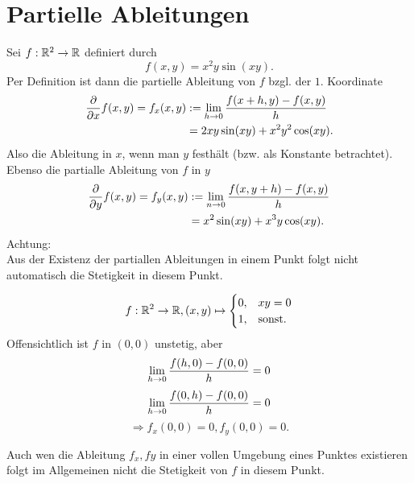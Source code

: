 \documentclass[../ana2u.tex]{subfiles}
\begin{document}
\setcounter{section}{8}
\section{Partielle Ableitungen}
Sei \( f:\mathbb{R}^2\rightarrow \mathbb{R} \) definiert 
durch 
\[ f(x,y) = x^2 y \sin(xy). \]
Per Definition ist dann die partielle 
Ableitung von \(f\) bzgl. der \(1.\) Koordinate
\begin{align*}
    \frac{\partial}{\partial x} f(x,y) = f_x(x,y) 
    &:= \lim\limits_{h\rightarrow{}0} \frac{f(x+h,y) - f(x,y)}{h} \\
    &= 2xy \sin(xy) + x^2y^2 \cos(xy).
\end{align*}
Also die Ableitung in \(x\), wenn man \(y\)
festhält (bzw. als Konstante betrachtet). \\
Ebenso die partialle Ableitung von \(f\) in \(y\)
\begin{align*}
    \frac{\partial}{\partial y} f(x,y) = f_y(x,y) 
    &:= \lim\limits_{n\rightarrow{}0} \frac{f(x,y+h) - f(x,y)}{h} \\
    &= x^2\sin(xy) + x^3y \cos (xy).
\end{align*}
Achtung: \\
Aus der Existenz der partiallen Ableitungen
in einem Punkt folgt nicht automatisch die 
Stetigkeit in diesem Punkt.
\begin{bsp}
    \[ f:\mathbb{R}^2\rightarrow \mathbb{R}, (x,y) \mapsto \begin{cases}
        0, &xy = 0\\
        1, &\text{sonst.}
    \end{cases} \]
    Offensichtlich ist \( f \) in \( (0,0) \) 
    unstetig, aber 
    \[ \lim\limits_{h\rightarrow{}0} \frac{f(h,0) - f(0,0)}{h} = 0 \]
    \[ \lim\limits_{h\rightarrow{}0} \frac{f(0,h) - f(0,0)}{h} = 0 \]
    \[ \Rightarrow f_x(0,0) = 0, f_y(0,0) = 0. \]    
\end{bsp}
Auch wen die Ableitung \(f_x, fy\) in einer vollen
Umgebung eines Punktes existieren folgt im 
Allgemeinen nicht die Stetigkeit von \(f\) in diesem
Punkt.
\end{document}
